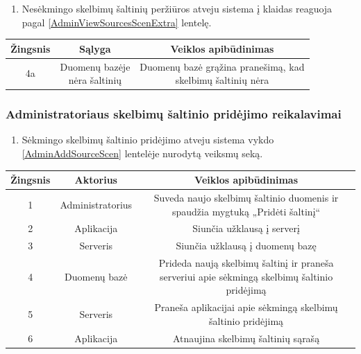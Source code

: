 \documentclass[12pt]{article}
\begin{document}
	\begin{enumerate}[resume,labelindent=10pt,leftmargin=2.2cm]
		\item Nesėkmingo skelbimų šaltinių peržiūros atveju sistema į klaidas reaguoja pagal \ref{AdminViewSourcesScenExtra} lentelę.
	\end{enumerate}
	
		\begin{center}
		\begin{tabular}{ | c | c | c | }
			\hline
			Žingsnis & Sąlyga         & Veiklos apibūdinimas \\ \hline
			4a       & \makecell{Duomenų bazėje \\ nėra šaltinių} & \makecell{Duomenų bazė grąžina pranešimą, kad \\ skelbimų šaltinių nėra} \\ \hline
		\end{tabular}
		\end{center}
		\pagebreak
	
	\subsubsection{Administratoriaus skelbimų šaltinio pridėjimo reikalavimai}
	\begin{enumerate}[labelindent=10pt,leftmargin=2.2cm]
		\item Sėkmingo skelbimų šaltinio pridėjimo atveju sistema vykdo \ref{AdminAddSourceScen} lentelėje nurodytą veiksmų seką.
	\end{enumerate}
		
		\begin{center}
		\begin{tabular}{ | c | c | c | }
			\hline
			Žingsnis & Aktorius         & Veiklos apibūdinimas \\ \hline
			1        & Administratorius & \makecell{Suveda naujo skelbimų šaltinio duomenis ir \\ spaudžia mygtuką „Pridėti šaltinį“ } \\ \hline
			2        & Aplikacija       & Siunčia užklausą į serverį \\ \hline
			3        & Serveris         & Siunčia užklausą į duomenų bazę \\ \hline
			4        & Duomenų bazė     & \makecell{Prideda naują skelbimų šaltinį ir praneša \\ serveriui apie sėkmingą skelbimų šaltinio pridėjimą} \\ \hline
			5        & Serveris         & \makecell{Praneša aplikacijai apie sėkmingą skelbimų \\ šaltinio pridėjimą} \\ \hline
			6        & Aplikacija       & Atnaujina skelbimų šaltinių sąrašą \\ \hline
		\end{tabular}
		\end{center}
		\bigskip
\end{document}
